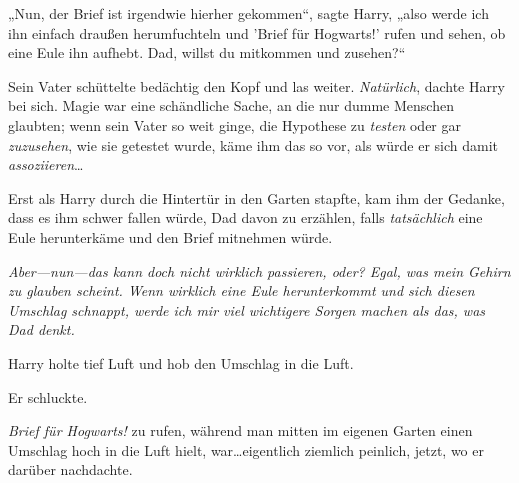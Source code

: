 „Nun, der Brief ist irgendwie hierher gekommen“, sagte Harry, „also werde ich ihn einfach draußen herumfuchteln und 'Brief für Hogwarts!' rufen und sehen, ob eine Eule ihn aufhebt. Dad, willst du mitkommen und zusehen?“

Sein Vater schüttelte bedächtig den Kopf und las weiter. \emph{Natürlich}, dachte Harry bei sich. Magie war eine schändliche Sache, an die nur dumme Menschen glaubten; wenn sein Vater so weit ginge, die Hypothese zu \emph{testen} oder gar \emph{zuzusehen}, wie sie getestet wurde, käme ihm das so vor, als würde er sich damit \emph{assoziieren}…

Erst als Harry durch die Hintertür in den Garten stapfte, kam ihm der Gedanke, dass es ihm schwer fallen würde, Dad davon zu erzählen, falls \emph{tatsächlich} eine Eule herunterkäme und den Brief mitnehmen würde.

\emph{Aber—nun—das kann doch nicht \emph{wirklich} passieren, oder? Egal, was mein Gehirn zu glauben scheint. Wenn wirklich eine Eule herunterkommt und sich diesen Umschlag schnappt, werde ich mir viel wichtigere Sorgen machen als das, was Dad denkt.}

Harry holte tief Luft und hob den Umschlag in die Luft.

Er schluckte.

\emph{Brief für Hogwarts!} zu rufen, während man mitten im eigenen Garten einen Umschlag hoch in die Luft hielt, war…eigentlich ziemlich peinlich, jetzt, wo er darüber nachdachte.

